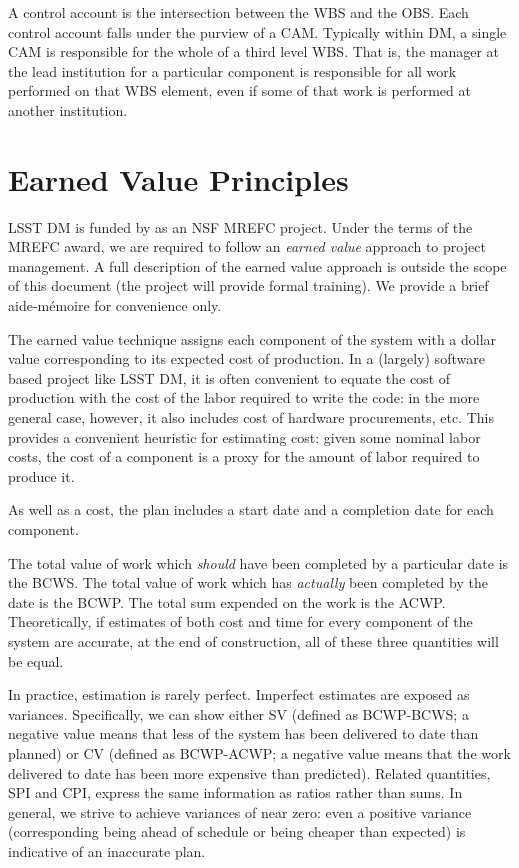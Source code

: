 A control account is the intersection between the WBS and the OBS. Each
control account falls under the purview of a CAM. Typically within DM, a
single CAM is responsible for the whole of a third level WBS. That is,
the manager at the lead institution for a particular component is
responsible for all work performed on that WBS element, even if some of
that work is performed at another institution.

\section{Earned Value Principles}\label{earned-value-principles}

LSST DM is funded by as an NSF MREFC project. Under the terms of the
MREFC award, we are required to follow an \emph{earned value} approach
to project management. A full description of the earned value approach
is outside the scope of this document (the project will provide formal
training). We provide a brief aide-mémoire for convenience only.

The earned value technique assigns each component of the system with a
dollar value corresponding to its expected cost of production. In a
(largely) software based project like LSST DM, it is often convenient to
equate the cost of production with the cost of the labor required to
write the code: in the more general case, however, it also includes cost
of hardware procurements, etc. This provides a convenient heuristic for
estimating cost: given some nominal labor costs, the cost of a component
is a proxy for the amount of labor required to produce it.

As well as a cost, the plan includes a start date and a completion date
for each component.

The total value of work which \emph{should} have been completed by a
particular date is the BCWS. The total value of work which has
\emph{actually} been completed by the date is the BCWP. The total sum
expended on the work is the ACWP. Theoretically, if estimates of both
cost and time for every component of the system are accurate, at the end
of construction, all of these three quantities will be equal.

In practice, estimation is rarely perfect. Imperfect estimates are
exposed as variances. Specifically, we can show either SV (defined as
BCWP-BCWS; a negative value means that less of the system has been
delivered to date than planned) or CV (defined as BCWP-ACWP; a negative
value means that the work delivered to date has been more expensive than
predicted). Related quantities, SPI and CPI, express the same
information as ratios rather than sums. In general, we strive to achieve
variances of near zero: even a positive variance (corresponding being
ahead of schedule or being cheaper than expected) is indicative of an
inaccurate plan.

